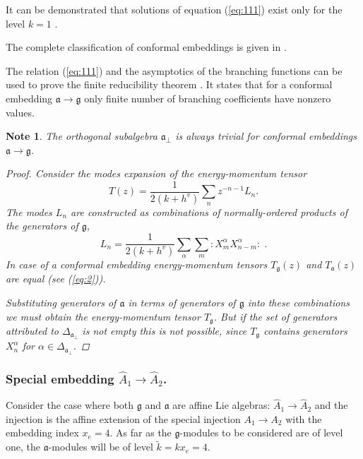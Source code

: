 \documentclass[12pt]{iopart}
\newtheorem{mynote}{Note}[section]
\theoremstyle{definition}
\newcommand{\gf}{\mathfrak{g}}
\newcommand{\af}{\mathfrak{a}}
\newcommand{\afb}{\mathfrak{a}_{\bot}}
\begin{document}
It can be demonstrated that solutions of equation (\ref{eq:111}) exist only
for the level $k=1$ \cite{difrancesco1997cft}.

The complete classification of conformal embeddings is given in \cite{schellekens1986conformal}.

The relation (\ref{eq:111}) and the asymptotics of the branching functions can be used
to prove the finite reducibility theorem \cite{kac1988modular}.
It states that for a conformal embedding  $\af\longrightarrow\mathfrak{g}$
only finite number of branching coefficients have nonzero values.

\begin{mynote} The orthogonal subalgebra $\afb$ is always trivial
for conformal embeddings $\af\longrightarrow \mathfrak{g}$.
\begin{proof}
Consider the modes expansion of the energy-momentum tensor
\begin{equation*}
\label{eq:47}
  T(z)=\frac{1}{2(k+h^v)}\sum_n z^{-n-1}L_n.
\end{equation*}
The modes $L_n$ are constructed as combinations of normally-ordered products of the generators of $\mathfrak{g}$,
\begin{equation*}
\label{eq:48}
  L_n=\frac{1}{2(k+h^v)}\sum_{\alpha}\sum_m:X^{\alpha}_m X^{\alpha}_{n-m}: \; .
\end{equation*}
In case of a conformal embedding energy-momentum tensors $T_{\mathfrak{g}}(z)$ and $T_{\af}(z)$ are
equal (see (\ref{eq:2})).

Substituting generators of $\af$  in terms of generators of $\mathfrak{g}$ into these combinations
we must obtain the energy-momentum tensor $T_{\mathfrak{g}}$.
But if the set of generators attributed to $\Delta_{\afb}$ is not empty this is not possible,
since $T_{\mathfrak{g}}$ contains generators $X^{\alpha}_n$ for $\alpha\in \Delta_{\afb}$.
\end{proof}
\end{mynote}



\subsubsection{Special embedding $\hat{A}_1\rightarrow\hat{A}_2$.}
\label{sec:spec-embedd-hata_1s}

Consider the case where both $\gf$ and $\af$ are affine Lie algebras:
$\hat{A}_1 \rightarrow \hat{A}_2$ and the injection is the affine extension of the
special injection $A_1 \rightarrow A_2$ with the embedding index $x_e=4$.
As far as the $\gf$-modules to be considered are of level one,
the $\af$-modules will be of level $\tilde{k}=kx_e=4$.
\end{document}
